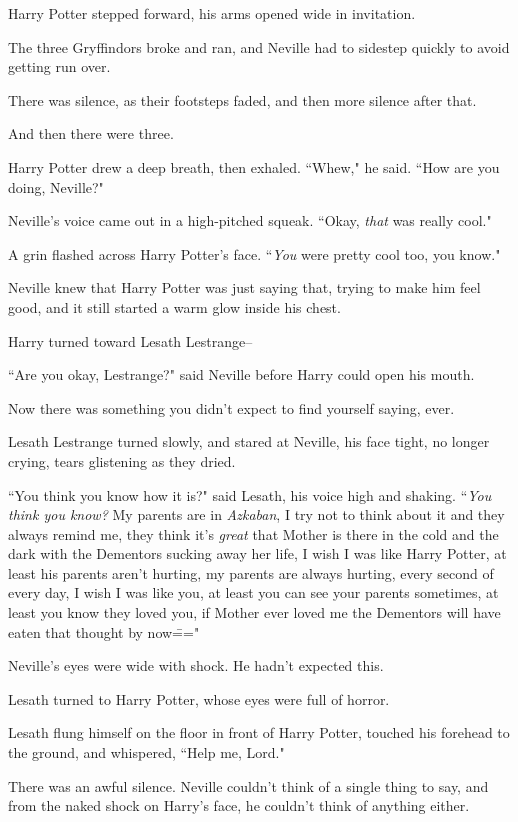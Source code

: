 Harry Potter stepped forward, his arms opened wide in invitation.

The three Gryffindors broke and ran, and Neville had to sidestep quickly to avoid getting run over.

There was silence, as their footsteps faded, and then more silence after that.

And then there were three.

Harry Potter drew a deep breath, then exhaled. ``Whew," he said. ``How are you doing, Neville?"

Neville's voice came out in a high-pitched squeak. ``Okay, \emph{that} was really cool."

A grin flashed across Harry Potter's face. ``\emph{You} were pretty cool too, you know."

Neville knew that Harry Potter was just saying that, trying to make him feel good, and it still started a warm glow inside his chest.

Harry turned toward Lesath Lestrange\---

``Are you okay, Lestrange?" said Neville before Harry could open his mouth.

Now there was something you didn't expect to find yourself saying, ever.

Lesath Lestrange turned slowly, and stared at Neville, his face tight, no longer crying, tears glistening as they dried.

``You think you know how it is?" said Lesath, his voice high and shaking. ``\emph{You think you know?} My parents are in \emph{Azkaban}, I try not to think about it and they always remind me, they think it's \emph{great} that Mother is there in the cold and the dark with the Dementors sucking away her life, I wish I was like Harry Potter, at least his parents aren't hurting, my parents are always hurting, every second of every day, I wish I was like you, at least you can see your parents sometimes, at least you know they loved you, if Mother ever loved me the Dementors will have eaten that thought by now\==="

Neville's eyes were wide with shock. He hadn't expected this.

Lesath turned to Harry Potter, whose eyes were full of horror.

Lesath flung himself on the floor in front of Harry Potter, touched his forehead to the ground, and whispered, ``Help me, Lord."

There was an awful silence. Neville couldn't think of a single thing to say, and from the naked shock on Harry's face, he couldn't think of anything either.

